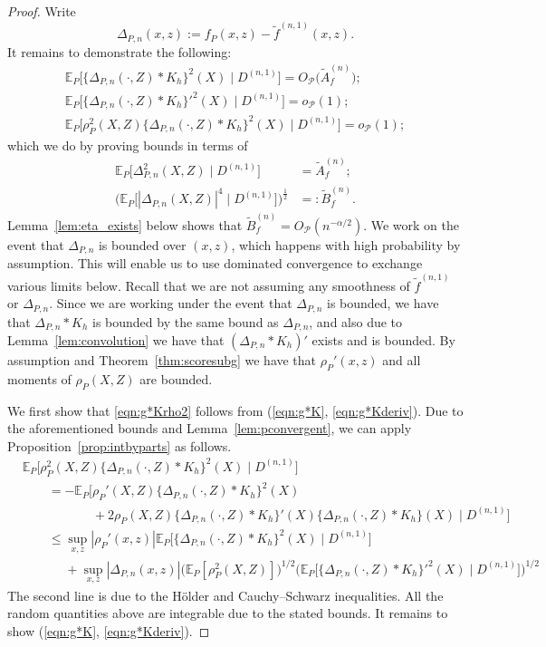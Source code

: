 \documentclass[aos]{imsart}
\newcommand{\E}{\mathbb{E}}
\begin{document}
\begin{proof}
		
		Write \begin{equation*}
			\Delta_{P,n}(x,z) := f_P(x,z) - \tilde f^{(n,1)}(x,z).
		\end{equation*} It remains to demonstrate the following:
		\begin{align}
			\E_P\big[\{\Delta_{P,n}(\cdot,Z)*K_h\}^2(X) \;\big|\; D^{(n,1)} \big] = O_{\mathcal{P}}\big(\tilde{A}_f^{(n)}\big); \label{eqn:g*K}\\
			\E_P\big[\{\Delta_{P,n}(\cdot,Z)*K_h\}'^2(X) \;\big|\; D^{(n,1)} \big] = o_{\mathcal{P}}(1); \label{eqn:g*Kderiv}\\
			\E_P\big[\rho_P^2(X,Z)\{\Delta_{P,n}(\cdot,Z)*K_h\}^2(X) \;\big|\; D^{(n,1)}\big] = o_{\mathcal{P}}(1) ;\label{eqn:g*Krho2}
		\end{align}
		which we do by proving bounds in terms of
		\begin{align}
			\E_P\big[\Delta_{P,n}^2(X,Z)\;\big|\; D^{(n,1)}\big] &= \tilde{A}_f^{(n)}; \nonumber\\
			\big(\E_P\big[|\Delta_{P,n}(X,Z)|^{4}\;\big|\; D^{(n,1)}\big]\big)^{\frac{1}{2}} &=: \tilde{B}_f^{(n)}.\label{eqn:Bgdefn}
		\end{align}
		Lemma~\ref{lem:eta_exists} below shows that $\tilde{B}_f^{(n)} = O_{\mathcal{P}}(n^{-\alpha/2})$. 
		We work on the event that $\Delta_{P,n}$ is bounded over $(x,z)$, which happens with high probability by assumption. This will enable us to use dominated convergence to exchange various limits below. Recall that we are not assuming any smoothness of $\tilde f^{(n,1)}$ or $\Delta_{P,n}$. Since we are working under the event that $\Delta_{P,n}$ is bounded, we have that $\Delta_{P,n}*K_h$ is bounded by the same bound as $\Delta_{P,n}$, and also due to Lemma~\ref{lem:convolution} we have that $(\Delta_{P,n}*K_h)'$ exists and is bounded. By assumption and Theorem~\ref{thm:scoresubg} we have that $\rho_P'(x,z)$ and all moments of $\rho_P(X,Z)$ are bounded.
		
		
		We first show that \eqref{eqn:g*Krho2} follows from (\ref{eqn:g*K}, \ref{eqn:g*Kderiv}). Due to the aforementioned bounds and Lemma~\ref{lem:pconvergent}, we can apply Proposition~\ref{prop:intbyparts} as follows.
		\begin{align*}
			&\E_P\big[\rho_P^2(X,Z)\{\Delta_{P,n}(\cdot,Z)*K_h\}^2(X) \;\big|\; D^{(n,1)} \big]\\ &\qquad = -\E_P\big[\rho_P'(X,Z)\{\Delta_{P,n}(\cdot,Z)*K_h\}^2(X) \\
			&\qquad\phantom{= -\E_P\big[}+ 2\rho_P(X,Z)\{\Delta_{P,n}(\cdot,Z)*K_h\}'(X)\{\Delta_{P,n}(\cdot,Z)*K_h\}(X) \;\big|\; D^{(n,1)} \big]\\
			&\qquad\leq \sup_{x,z}|\rho_P'(x,z)| \E_P\big[\{\Delta_{P,n}(\cdot,Z)*K_h\}^2(X)\;\big|\; D^{(n,1)} \big]\\
			&\qquad\phantom{=} + \sup_{x,z} | \Delta_{P,n}(x,z)|\big(\E_P[\rho^2_P(X,Z)]\big)^{1/2}\big(\E_P\big[\{\Delta_{P,n}(\cdot,Z)*K_h\}'^2(X) \;\big|\; D^{(n,1)} \big]\big)^{1/2}
		\end{align*}
		The second line is due to the H\"older and Cauchy--Schwarz inequalities. All the random quantities above are integrable due to the stated bounds.
		It remains to show (\ref{eqn:g*K}, \ref{eqn:g*Kderiv}).
		

\end{proof}
\end{document}
